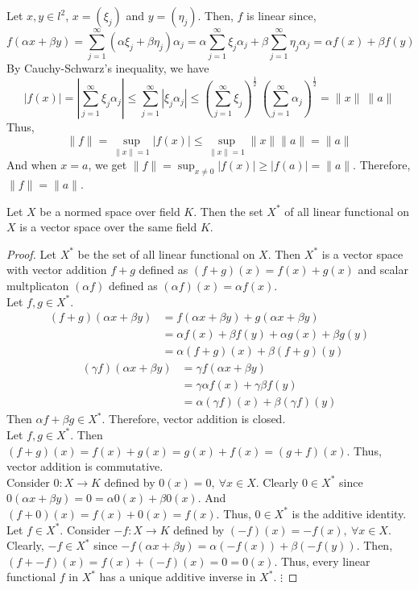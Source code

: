 		Let $x,y \in l^2$, $x = (\xi_j)$ and $y = (\eta_j)$.
		Then, $f$ is linear since,
		\[ f(\alpha x + \beta y) =  \sum_{j = 1}^\infty (\alpha \xi_j+ \beta \eta_j) \alpha_j = \alpha \sum_{j =1}^\infty \xi_j \alpha_j + \beta \sum_{j=1}^\infty \eta_j \alpha_j = \alpha f(x) + \beta f(y) \]
		By Cauchy-Schwarz's inequality, we have
		\[ |f(x)| = \left|\sum_{j=1}^\infty \xi_j \alpha_j \right| \le \sum_{j=1}^\infty |\xi_j \alpha_j| \le \left( \sum_{j=1}^\infty \xi_j \right)^\frac{1}{2}\ \left(\sum_{j=1}^\infty \alpha_j \right)^\frac{1}{2} = \|x\| \ \|a\| \]
		Thus, 
		\[ \|f\| = \sup_{\|x\| = 1} |f(x)| \le \sup_{\|x\| = 1} \|x\|\|a\| = \|a\| \]
		And when $x = a$, we get $\|f\| = \sup_{x \ne 0} |f(x)| \ge |f(a)| = \|a\|$.
		Therefore, $\|f\| = \|a\|$.

\begin{commentary}
\begin{remark}
	Let $X$ be a normed space over field $K$.
	Then the set $X^\ast$ of all linear functional on $X$ is a vector space over the same field $K$.
\end{remark}
\begin{proof}
	Let $X^\ast$ be the set of all linear functional on $X$.
	Then $X^\ast$ is a vector space with vector addition $f+g$ defined as $(f+g)(x) = f(x) + g(x)$ and scalar multplicaton $(\alpha f)$ defined as $(\alpha f)(x) = \alpha f(x)$.\\

	Let $f,g \in X^\ast$.
	\begin{align*}
		(f+g)(\alpha x + \beta y) 
		& = f(\alpha x + \beta y) + g(\alpha x + \beta y) \\
		& = \alpha f(x) + \beta f(y) + \alpha g(x) + \beta g(y) \\
		& = \alpha (f+g)(x) + \beta (f+g)(y)
	\end{align*}
	\begin{align*}
		(\gamma f)(\alpha x + \beta y) 
		& = \gamma f(\alpha x + \beta y) \\
		& = \gamma \alpha f(x) + \gamma \beta f(y) \\
		& = \alpha (\gamma f)(x) + \beta (\gamma f)(y)
	\end{align*}
	Then $\alpha f+ \beta g \in X^\ast$.
	Therefore, vector addition is closed.\\

	Let $f,g \in X^\ast$.
	Then $(f+g)(x) = f(x) + g(x) = g(x) + f(x) = (g+f)(x)$.
	Thus, vector addition is commutative.\\

	Consider $0 : X \to K$ defined by $0(x) = 0,\ \forall x \in X$.
	Clearly $0 \in X^\ast$ since $0(\alpha x + \beta y) = 0 = \alpha 0(x) + \beta 0(x)$.
	And $(f+0)(x) = f(x) + 0(x) = f(x)$.
	Thus, $0 \in X^\ast$ is the additive identity.\\

	Let $f \in X^\ast$.
	Consider $-f : X \to K$ defined by $(-f)(x) = -f(x),\ \forall x \in X$.
	Clearly, $-f \in X^\ast$ since $-f(\alpha x + \beta y) = \alpha (-f(x)) + \beta (-f(y))$.
	Then, $(f + -f)(x) = f(x) + (-f)(x) = 0 = 0(x)$.
	Thus, every linear functional $f$ in $X^\ast$ has a unique additive inverse in $X^\ast$.
	$\vdots$
\end{proof}
\end{commentary}

